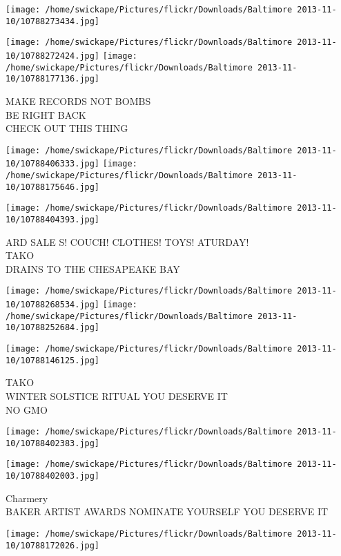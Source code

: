 \documentclass[10pt,letterpaper]{article}
\begin{document}
\texttt{[image: /home/swickape/Pictures/flickr/Downloads/Baltimore 2013-11-10/10788273434.jpg]}

\vspace{0.25in}
\texttt{[image: /home/swickape/Pictures/flickr/Downloads/Baltimore 2013-11-10/10788272424.jpg]}
\texttt{[image: /home/swickape/Pictures/flickr/Downloads/Baltimore 2013-11-10/10788177136.jpg]}

MAKE RECORDS NOT BOMBS\\
BE RIGHT BACK\\
CHECK OUT THIS THING
\pagebreak

\texttt{[image: /home/swickape/Pictures/flickr/Downloads/Baltimore 2013-11-10/10788406333.jpg]}
\texttt{[image: /home/swickape/Pictures/flickr/Downloads/Baltimore 2013-11-10/10788175646.jpg]}

\vspace{0.25in}
\texttt{[image: /home/swickape/Pictures/flickr/Downloads/Baltimore 2013-11-10/10788404393.jpg]}

ARD SALE S! COUCH! CLOTHES! TOYS! ATURDAY!\\
TAKO\\
DRAINS TO THE CHESAPEAKE BAY
\pagebreak

\texttt{[image: /home/swickape/Pictures/flickr/Downloads/Baltimore 2013-11-10/10788268534.jpg]}
\texttt{[image: /home/swickape/Pictures/flickr/Downloads/Baltimore 2013-11-10/10788252684.jpg]}

\texttt{[image: /home/swickape/Pictures/flickr/Downloads/Baltimore 2013-11-10/10788146125.jpg]}

TAKO\\
WINTER SOLSTICE RITUAL YOU DESERVE IT\\
NO GMO
\pagebreak

\texttt{[image: /home/swickape/Pictures/flickr/Downloads/Baltimore 2013-11-10/10788402383.jpg]}

\vspace{0.25in}
\texttt{[image: /home/swickape/Pictures/flickr/Downloads/Baltimore 2013-11-10/10788402003.jpg]}

Charmery\\
BAKER ARTIST AWARDS NOMINATE YOURSELF YOU DESERVE IT
\pagebreak

\texttt{[image: /home/swickape/Pictures/flickr/Downloads/Baltimore 2013-11-10/10788172026.jpg]}
\end{document}
